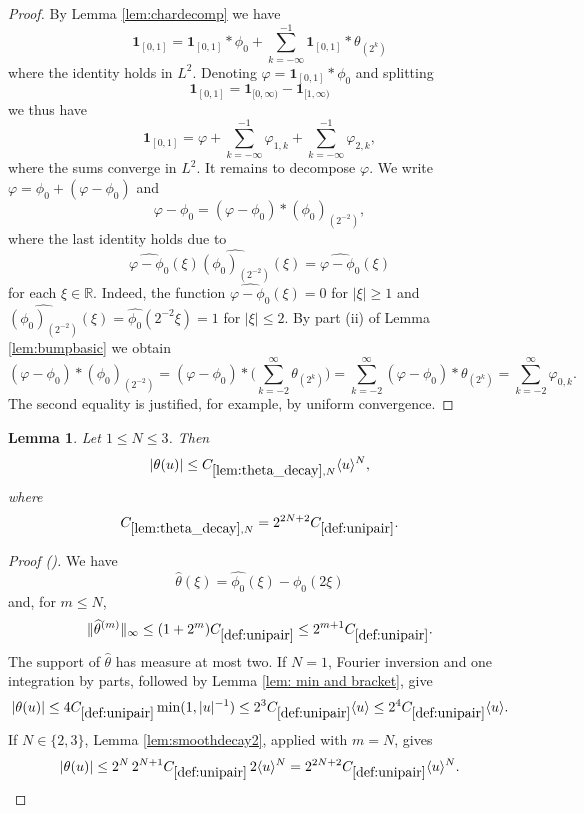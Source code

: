 \documentclass[12pt,reqno]{amsart}
\newcommand{\auto}{{({\tiny\faCar})}}
\theoremstyle{plain}
\newtheorem{lemma}[theorem]{Lemma}
\numberwithin{equation}{section}
\theoremstyle{remark}
\newcommand{\uses}[1]{}
\newcommand{\usesdefs}[1]{}
\newcommand{\R}{{\mathbb R}}
\begin{document}
\begin{proof}
By Lemma \ref{lem:chardecomp} we have
\begin{equation}
    \label{eq:L2char}
    \mathbf{1}_{[0,1]} =\mathbf{1}_{[0,1]}\ast\phi_0  +  \sum_{k=-\infty}^{-1} \mathbf{1}_{[0,1]}\ast  \theta_{(2^k)}
\end{equation}
where the identity holds in $L^2$.
Denoting $\varphi=\mathbf{1}_{[0,1]}\ast\phi_0$ and splitting
\[\mathbf{1}_{[0,1]} = \mathbf{1}_{[0,\infty)} - \mathbf{1}_{[1,\infty)}\]
 we  thus have
\[\mathbf{1}_{[0,1]} = \varphi +  \sum_{k=-\infty}^{-1} \varphi_{1,k}+ \sum_{k=-\infty}^{-1}\varphi_{2,k},\]
where the sums converge in $L^2$.
It remains to decompose $\varphi$.
We  write $\varphi= \phi_0 + (\varphi-\phi_0)$
and
\[
\varphi-\phi_0 = (\varphi - \phi_0)*(\phi_0)_{(2^{-2})},\]
where the last identity holds due to
\[\widehat{\varphi-\phi_0}(\xi) \widehat{(\phi_0)_{(2^{-2})}}(\xi) = \widehat{\varphi-\phi_0}(\xi) \]
for each $\xi\in \R$. Indeed, the function $\widehat{\varphi-\phi_0}(\xi)=0$ for $|\xi|\ge 1$ and $\widehat{(\phi_0)_{(2^{-2})}}(\xi) = \widehat{\phi_0}(2^{-2}\xi) =1$ for $|\xi|\le 2$.
By part (ii) of Lemma \ref{lem:bumpbasic} we obtain
\[ (\varphi - \phi_0)*(\phi_0)_{(2^{-2})} =  (\varphi - \phi_0)*\Big( \sum_{k=-2}^\infty \theta_{(2^k)}\Big )  =  \sum_{k=-2}^\infty (\varphi - \phi_0)*\theta_{(2^k)} =   \sum_{k=-2}^\infty \varphi_{0,k}.
\]
The  second equality is justified, for example, by uniform convergence.
\end{proof}

\begin{lemma}\label{lem:theta_decay}\uses{lem:smoothdecay2,lem: min and bracket}\usesdefs{bracket bump,def:cn-window,def:unipair,defn:window based bump functions}
Let $1\le N\le3$. Then
\begin{equation}\label{auto:theta-decay}
|\theta(u)|\le C_{\ref{lem:theta_decay},N}\langle u\rangle^N,
\end{equation}
where
\begin{equation}\label{auto:theta-decay-constant-definition}
C_{\ref{lem:theta_decay},N}=2^{2N+2}C_{\ref{def:unipair}}.
\end{equation}
\end{lemma}
\begin{proof}[Proof \auto]
We have
\[
\widehat\theta(\xi)=\widehat{\phi_0}(\xi)-\widehat{\phi_0}(2\xi)
\]
and, for $m\le N$,
\[
\|\widehat\theta^{(m)}\|_\infty
\le(1+2^m)C_{\ref{def:unipair}}\le2^{m+1}C_{\ref{def:unipair}}.
\]
The support of $\widehat\theta$ has measure at most two. If $N=1$, Fourier inversion and one integration by parts, followed by Lemma \ref{lem: min and bracket}, give
\[
|\theta(u)|
\le4C_{\ref{def:unipair}}\min(1,|u|^{-1})
\le2^3C_{\ref{def:unipair}}\langle u\rangle
\le2^4C_{\ref{def:unipair}}\langle u\rangle.
\]
If $N\in\{2,3\}$, Lemma \ref{lem:smoothdecay2}, applied with $m=N$, gives
\[
|\theta(u)|
\le2^N\,2^{N+1}C_{\ref{def:unipair}}\,2\langle u\rangle^N
=2^{2N+2}C_{\ref{def:unipair}}\langle u\rangle^N.
\]
\end{proof}
\end{document}
